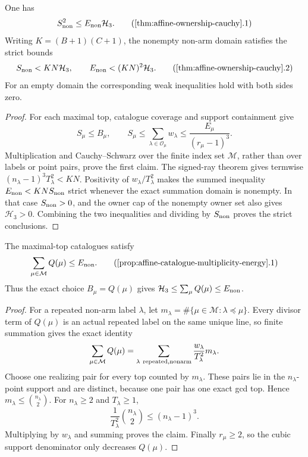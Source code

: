 \begin{theorem}
\label{thm:affine-ownership-cauchy}
One has
\[
 S_{\rm non}^2\le E_{\rm non}\mathcal H_3.
 \tag{\ref{thm:affine-ownership-cauchy}.1}
\]
Writing \(K=(B+1)(C+1)\), the nonempty non-arm domain satisfies the strict
bounds
\[
 S_{\rm non}<KN\mathcal H_3,\qquad
 E_{\rm non}<(KN)^2\mathcal H_3.
 \tag{\ref{thm:affine-ownership-cauchy}.2}
\]
For an empty domain the corresponding weak inequalities hold with both
sides zero.
\end{theorem}

\begin{proof}
For each maximal top, catalogue coverage and support containment give
\[
 S_\mu\le B_\mu,\qquad
 S_\mu\le\sum_{\lambda\in\mathcal O_\mu}w_\lambda
       \le\frac{E_\mu}{(r_\mu-1)^3}.
\]
Multiplication and Cauchy--Schwarz over the finite index set
\(\mathcal M\), rather than over labels or point pairs, prove the first
claim.  The signed-ray theorem gives termwise
\((n_\lambda-1)^3T_\lambda^2<KN\).  Positivity of
\(w_\lambda/T_\lambda^2\) makes the summed inequality
\(E_{\rm non}<KN S_{\rm non}\) strict whenever the exact summation domain is
nonempty.  In that case \(S_{\rm non}>0\), and the owner cap of the nonempty
owner set also gives \(\mathcal H_3>0\).  Combining the two inequalities and
dividing by \(S_{\rm non}\) proves the strict conclusions.
\end{proof}

\begin{proposition}
\label{prop:affine-catalogue-multiplicity-energy}
The maximal-top catalogues satisfy
\[
 \sum_{\mu\in\mathcal M}Q(\mu)\le E_{\rm non}.
 \tag{\ref{prop:affine-catalogue-multiplicity-energy}.1}
\]
Thus the exact choice \(B_\mu=Q(\mu)\) gives
\(\mathcal H_3\le\sum_\mu Q(\mu)\le E_{\rm non}\).
\end{proposition}

\begin{proof}
For a repeated non-arm label \(\lambda\), let
\(m_\lambda=\#\{\mu\in\mathcal M:\lambda\preceq\mu\}\).  Every divisor term
of \(Q(\mu)\) is an actual repeated label on the same unique line, so finite
summation gives the exact identity
\[
 \sum_{\mu\in\mathcal M}Q(\mu)=
 \sum_{\lambda\ {\rm repeated,nonarm}}
       \frac{w_\lambda}{T_\lambda^2}m_\lambda.
\]
Choose one realizing pair for every top counted by \(m_\lambda\).  These
pairs lie in the \(n_\lambda\)-point support and are distinct, because one
pair has one exact gcd top.  Hence
\(m_\lambda\le\binom{n_\lambda}{2}\).  For \(n_\lambda\ge2\) and
\(T_\lambda\ge1\),
\[
 \frac1{T_\lambda^2}\binom{n_\lambda}{2}\le(n_\lambda-1)^3.
\]
Multiplying by \(w_\lambda\) and summing proves the claim.  Finally
\(r_\mu\ge2\), so the cubic support denominator only decreases \(Q(\mu)\).
\end{proof}

